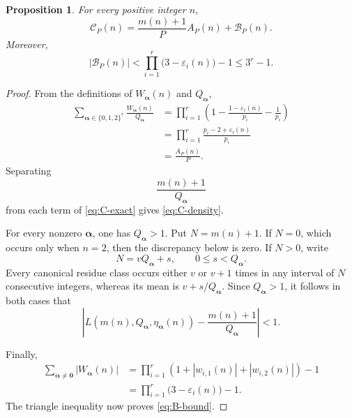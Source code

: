 \documentclass[12pt]{article}
\numberwithin{equation}{section}
\newtheorem{proposition}[theorem]{Proposition}
\theoremstyle{definition}
\theoremstyle{remark}
\newcommand{\Ccal}{\mathcal C}
\newcommand{\Bcal}{\mathcal B}
\begin{document}
\begin{proposition}
\label{prop:C-density}
For every positive integer $n$,
\begin{equation}
\label{eq:C-density}
\Ccal_P(n)
=
\frac{m(n)+1}{P}A_P(n)+\Bcal_P(n).
\end{equation}
Moreover,
\begin{equation}
\label{eq:B-bound}
\left|\Bcal_P(n)\right|
<
\prod_{i=1}^{r}
\bigl(3-\varepsilon_i(n)\bigr)-1
\leq3^r-1.
\end{equation}
\end{proposition}

\begin{proof}
From the definitions of
$W_{\boldsymbol\alpha}(n)$ and
$Q_{\boldsymbol\alpha}$,
\begin{align*}
\sum_{\boldsymbol\alpha\in\{0,1,2\}^r}
\frac{W_{\boldsymbol\alpha}(n)}
{Q_{\boldsymbol\alpha}}
&=
\prod_{i=1}^{r}
\left(
1-\frac{1-\varepsilon_i(n)}{p_i}
-\frac1{p_i}
\right)
\\
&=
\prod_{i=1}^{r}
\frac{p_i-2+\varepsilon_i(n)}{p_i}
\\
&=
\frac{A_P(n)}{P}.
\end{align*}
Separating
\[
\frac{m(n)+1}{Q_{\boldsymbol\alpha}}
\]
from each term of \eqref{eq:C-exact} gives
\eqref{eq:C-density}.

For every nonzero $\boldsymbol\alpha$, one has
$Q_{\boldsymbol\alpha}>1$. Put $N=m(n)+1$. If $N=0$, which
occurs only when $n=2$, then the discrepancy below is zero. If
$N>0$, write
\[
N=vQ_{\boldsymbol\alpha}+s,
\qquad
0\leq s<Q_{\boldsymbol\alpha}.
\]
Every canonical residue class occurs either $v$ or $v+1$ times
in any interval of $N$ consecutive integers, whereas its mean is
$v+s/Q_{\boldsymbol\alpha}$. Since
$Q_{\boldsymbol\alpha}>1$, it follows in both cases that
\[
\left|
L\left(
m(n),
Q_{\boldsymbol\alpha},
\eta_{\boldsymbol\alpha}(n)
\right)
-
\frac{m(n)+1}{Q_{\boldsymbol\alpha}}
\right|
<1.
\]

Finally,
\begin{align*}
\sum_{\boldsymbol\alpha\neq\boldsymbol0}
\left|W_{\boldsymbol\alpha}(n)\right|
&=
\prod_{i=1}^{r}
\left(
1+\left|w_{i,1}(n)\right|+\left|w_{i,2}(n)\right|
\right)-1
\\
&=
\prod_{i=1}^{r}
\bigl(3-\varepsilon_i(n)\bigr)-1.
\end{align*}
The triangle inequality now proves \eqref{eq:B-bound}.
\end{proof}
\end{document}
